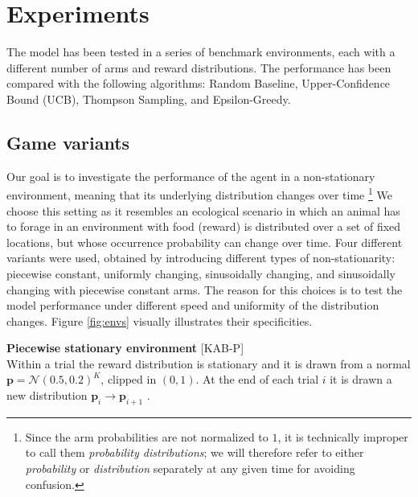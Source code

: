 \section{Experiments}

The model has been tested in a series of benchmark environments, each with a different number of arms and reward distributions. The performance has been compared with the following algorithms: Random Baseline, Upper-Confidence Bound (UCB), Thompson Sampling, and Epsilon-Greedy.

\subsection{Game variants}\label{sec:envs}

\noindent Our goal is to investigate the performance of the agent in a non-stationary environment, meaning that its underlying distribution changes over time \footnote{Since the arm probabilities are not normalized to $1$, it is
technically improper to call them \textit{probability distributions}; we will therefore refer to either \textit{probability} or \textit{distribution} separately at any given time for avoiding confusion.}
We choose this setting as it resembles an ecological scenario in which an animal has to forage in an environment with food (reward) is distributed over a set of fixed locations, but whose occurrence probability can change over time.
Four different variants were used, obtained by introducing different types of non-stationarity: piecewise constant, uniformly changing, sinusoidally changing, and sinusoidally changing with piecewise constant arms.
The reason for this choices is to test the model performance under different speed and uniformity of the distribution changes.
Figure \ref{fig:envs} visually illustrates their specificities.

\hfill \break
\noindent \textbf{Piecewise stationary environment} [\textsc{KAB-P}]\\ Within a trial the reward distribution is stationary and it is drawn from a normal $\mathbf{p}=\mathcal{N}(0.5, 0.2)^{K}$, clipped in $(0, 1)$. At the end of each trial $i$ it is drawn a new distribution $\mathbf{\mathbf{p}}_{i} \to \mathbf{\mathbf{p}}_{i+1}$ \cite{qiForcedExplorationBandit2023}.

